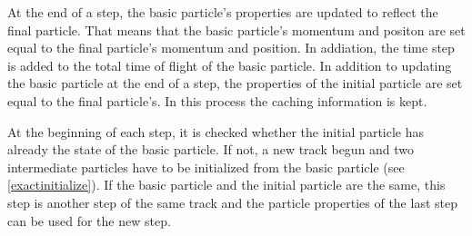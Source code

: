 	At the end of a step, the basic particle's properties are updated to reflect the final particle. That means that the basic particle's momentum and positon are set equal to the final particle's momentum and position. In addiation, the time step is added to the total time of flight of the basic particle.
	In addition to updating the basic particle at the end of a step, the properties of the initial particle are set equal to the final particle's. In this process the caching information is kept. 

	At the beginning of each step, it is checked whether the initial particle has already the state of the basic particle. If not, a new track begun and two intermediate particles have to be initialized from the basic particle (see \ref{exactinitialize}). If the basic particle and the initial particle are the same, this step is another step of the same track and the particle properties of the last step can be used for the new step.
	
	   
